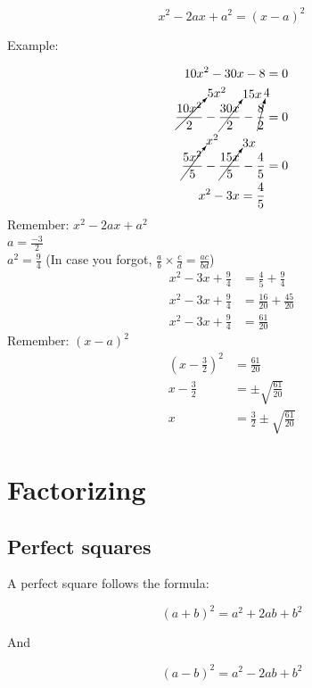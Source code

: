 \documentclass{book}
\begin{document}
\[
	x^2 - 2ax + a^2 = (x - a)^2
\]

Example:

\begin{center}
	\begin{align*}
		10x^2 - 30x - 8                                                                              & = 0 \\
		\cancelto{5x^2}{\frac{10x^2}{2}} - \cancelto{15x}{\frac{30x}{2}} - \cancelto{4}{\frac{8}{2}} & = 0 \\
		\cancelto{x^2}{\frac{5x^2}{5}} - \cancelto{3x}{\frac{15x}{5}} - \frac{4}{5}                  & = 0 \\
		x^2 - 3x = \frac{4}{5}
	\end{align*}
	Remember: $x^2 - 2ax + a^2$\\
	$a = \frac{-3}{2}$\\
	$a^2 = \frac{9}{4}$ (In case you forgot, $\frac{a}{b} \times \frac{c}{d} = \frac{ac}{bd}$)
	\begin{align*}
		x^2 - 3x + \frac{9}{4} & = \frac{4}{5} + \frac{9}{4}     \\
		x^2 - 3x + \frac{9}{4} & = \frac{16}{20} + \frac{45}{20} \\
		x^2 - 3x + \frac{9}{4} & = \frac{61}{20}
	\end{align*}
	Remember: $(x - a)^2$
	\begin{align*}
		(x - \frac{3}{2})^2 & = \frac{61}{20}                        \\
		x - \frac{3}{2}     & = \pm \sqrt{\frac{61}{20}}             \\
		x                   & = \frac{3}{2} \pm \sqrt{\frac{61}{20}}
	\end{align*}
\end{center}




\chapter{Factorizing}
\section{Perfect squares}
A perfect square follows the formula:

\[
	(a + b)^2 = a^2 + 2ab + b^2
\]

And

\[
	(a - b)^2 = a^2 - 2ab + b^2
\]
\end{document}
